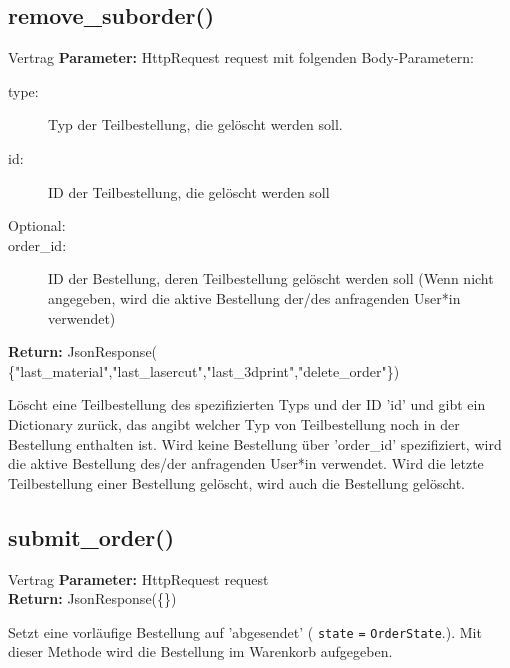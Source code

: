 \documentclass[12pt]{article}
\newcommand{\attribute}[1]{{\color{orange} \texttt{#1}}}
\newcommand{\orderState}[1]{{\color{red}\texttt{OrderState}\color{black}.\color{blue}{#1}}}
\newcommand{\insetContract}{12pt}
\newcommand{\insetMethodDescription}{-0.7cm}
\begin{document}
\subsection{remove_suborder()}
\begin{contract}{Vertrag}
    \textbf{Parameter:} HttpRequest request mit folgenden Body-Parametern:
    \begin{description}
        \item[\hspace{\insetContract} type:] Typ der Teilbestellung, die gelöscht werden soll.
        \item[\hspace{\insetContract} id:] ID der Teilbestellung, die gelöscht werden soll
        \item[Optional:] 
        \item[\hspace{\insetContract} order_id:] ID der Bestellung, deren Teilbestellung gelöscht werden soll (Wenn nicht angegeben, wird die aktive Bestellung der/des anfragenden User*in verwendet)
    \end{description}
    \textbf{Return:} JsonResponse(
        \{"last_material","last_lasercut","last_3dprint","delete_order"\})
\end{contract}
\hspace{\insetMethodDescription{}}
Löscht eine Teilbestellung des spezifizierten Typs und der ID 'id' und gibt ein Dictionary zurück, das angibt welcher Typ von Teilbestellung noch in der Bestellung enthalten ist.
Wird keine Bestellung über 'order_id' spezifiziert, wird die aktive Bestellung des/der anfragenden User*in verwendet.
Wird die letzte Teilbestellung einer Bestellung gelöscht, wird auch die Bestellung gelöscht.


\subsection{submit_order()}
\begin{contract}{Vertrag}
    \textbf{Parameter:}  HttpRequest request \\
    \textbf{Return:} JsonResponse(\{\})
\end{contract}
\hspace{\insetMethodDescription{}}
Setzt eine vorläufige Bestellung auf 'abgesendet' (\attribute{state} \texttt{=} \orderState{SUBMITTED}).
Mit dieser Methode wird die Bestellung im Warenkorb aufgegeben.
\end{document}
